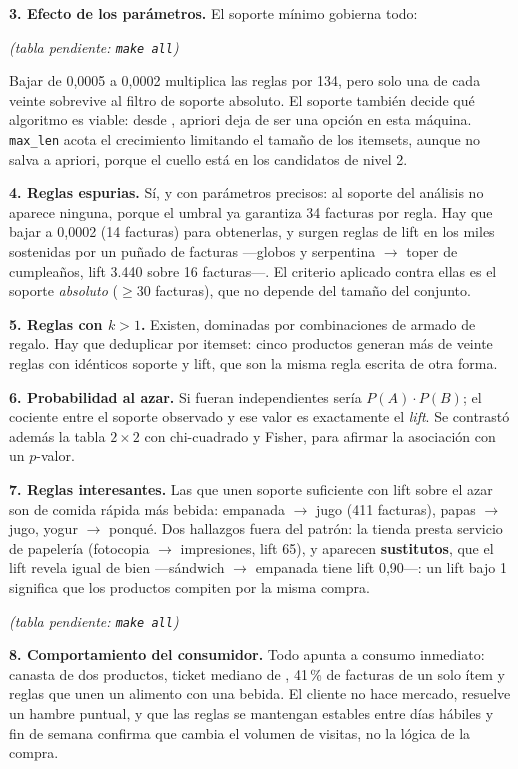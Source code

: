 \documentclass[12pt,twocolumn]{article}
\newcommand{\incluirtabla}[1]{
  \IfFileExists{tablas/#1}{\begin{center}\scriptsize
    \sbox0{}%
    \ifdim\wd0>\linewidth\resizebox{\linewidth}{!}{\usebox0}\else\usebox0\fi
    \end{center}}
  {\begin{center}\small\textit{(tabla pendiente: \texttt{make all})}\end{center}}}
\begin{document}
\textbf{3. Efecto de los parámetros.} El soporte mínimo gobierna todo:

\incluirtabla{parametros.tex}

Bajar de 0,0005 a 0,0002 multiplica las reglas por 134, pero solo una de cada veinte
sobrevive al filtro de soporte absoluto. El soporte también decide qué algoritmo es
viable: desde \cifraSoporteAprioriMuere{}, apriori deja de ser una opción en esta
máquina.
\texttt{max\_len} acota el crecimiento limitando el tamaño de los itemsets, aunque no
salva a apriori, porque el cuello está en los candidatos de nivel 2.

\textbf{4. Reglas espurias.} Sí, y con parámetros precisos: al soporte del análisis no
aparece ninguna, porque el umbral ya garantiza 34 facturas por regla. Hay que bajar a
0,0002 (14 facturas) para obtenerlas, y surgen reglas de lift en los miles sostenidas
por un puñado de facturas ---globos y serpentina $\rightarrow$ toper de cumpleaños,
lift 3.440 sobre 16 facturas---. El criterio aplicado contra ellas es el soporte
\emph{absoluto} ($\geq$30 facturas), que no depende del tamaño del conjunto.

\textbf{5. Reglas con $k>1$.} Existen, dominadas por combinaciones de armado de regalo.
Hay que deduplicar por itemset: cinco productos generan más de veinte reglas con
idénticos soporte y lift, que son la misma regla escrita de otra forma.

\textbf{6. Probabilidad al azar.} Si fueran independientes sería $P(A)\cdot P(B)$; el
cociente entre el soporte observado y ese valor es exactamente el \emph{lift}. Se
contrastó además la tabla $2\times2$ con chi-cuadrado y Fisher, para afirmar la
asociación con un $p$-valor.

\textbf{7. Reglas interesantes.} Las que unen soporte suficiente con lift sobre el azar
son de comida rápida más bebida: empanada $\rightarrow$ jugo (411 facturas), papas
$\rightarrow$ jugo, yogur $\rightarrow$ ponqué. Dos hallazgos fuera del patrón: la
tienda presta servicio de papelería (fotocopia $\rightarrow$ impresiones, lift 65), y
aparecen \textbf{sustitutos}, que el lift revela igual de bien ---sándwich
$\rightarrow$ empanada tiene lift 0,90---: un lift bajo 1 significa que los productos
compiten por la misma compra.

\incluirtabla{reglas.tex}

\textbf{8. Comportamiento del consumidor.} Todo apunta a consumo inmediato: canasta de
dos productos, ticket mediano de \cifraTicketMediano{}, 41\,\% de facturas de un solo
ítem y reglas que unen un alimento con una bebida. El cliente no hace mercado, resuelve
un hambre puntual, y que las reglas se mantengan estables entre días hábiles y fin de
semana confirma que cambia el volumen de visitas, no la lógica de la compra.
\end{document}
